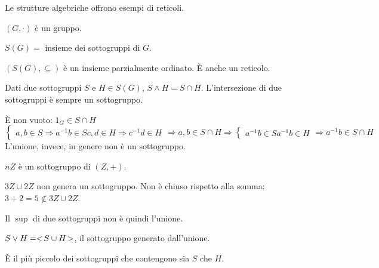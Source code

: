 Le strutture algebriche offrono esempi di reticoli.

$(G, \cdot)$ \`e un gruppo.

$S(G) =$ insieme dei sottogruppi di $G$.

$(S(G), \subseteq)$ \`e un insieme parzialmente ordinato. \`E anche un reticolo.

Dati due sottogruppi $S$ e $H \in S(G)$, $S \wedge H = S \cap H$. L'intersezione di due sottogruppi \`e sempre un sottogruppo.

\`E non vuoto: $1_G \in S \cap H$
\[
\begin{cases}
a, b \in S \Rightarrow a^{-1} b \in S
c, d \in H \Rightarrow c^{-1} d \in H
\end{cases}
\Rightarrow
a, b \in S \cap H \Rightarrow 
\begin{cases}
a^{-1} b \in S 
a^{-1} b \in H
\end{cases}
\Rightarrow
a^{-1} b \in S \cap H
\]
L'unione, invece, in genere non \`e un sottogruppo.

$n Z$ \`e un sottogruppo di $(Z, +)$.

$3 Z \cup 2 Z$ non genera un sottogruppo. Non \`e chiuso rispetto alla somma: $3 + 2 = 5 \notin 3 Z \cup 2 Z$.

Il $\sup$ di due sottogruppi non \`e quindi l'unione.

$S \vee H = <\!{S \cup H}\!>$, il sottogruppo generato dall'unione.

\`E il pi\`u piccolo dei sottogruppi che contengono sia $S$ che $H$.

